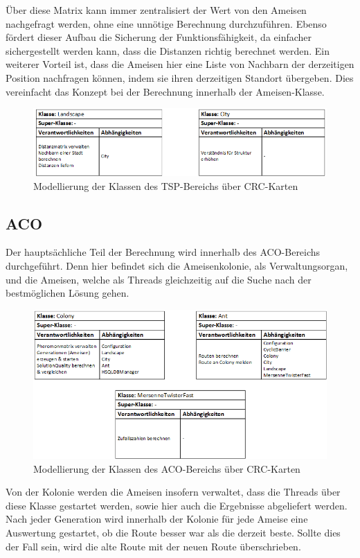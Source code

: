 Über diese Matrix kann immer zentralisiert der Wert von den Ameisen nachgefragt werden, ohne eine unnötige Berechnung durchzuführen. Ebenso fördert dieser Aufbau die Sicherung der Funktionsfähigkeit, da einfacher sichergestellt werden kann, dass die Distanzen richtig berechnet werden. Ein weiterer Vorteil ist, dass die Ameisen hier eine Liste von Nachbarn der derzeitigen Position nachfragen können, indem sie ihren derzeitigen Standort übergeben. Dies vereinfacht das Konzept bei der Berechnung innerhalb der Ameisen-Klasse.

\begin{figure}[h]
	\centering
	\includegraphics[width=0.7\linewidth]{images/CRC_tsp.png}
	\caption{Modellierung der Klassen des \acs{TSP}-Bereichs über CRC-Karten}
	\label{crcTsp}
\end{figure}

\newpage
\subsection{ACO}
Der hauptsächliche Teil der Berechnung wird innerhalb des \ac{ACO}-Bereichs durchgeführt. Denn hier befindet sich die Ameisenkolonie, als Verwaltungsorgan, und die Ameisen, welche als Threads gleichzeitig auf die Suche nach der bestmöglichen Lösung gehen.

\begin{figure}[h]
	\centering
	\includegraphics[width=0.8\linewidth]{images/CRC_aco.png}
	\caption{Modellierung der Klassen des \acs{ACO}-Bereichs über CRC-Karten}
	\label{crcAco}
\end{figure}

Von der Kolonie werden die Ameisen insofern verwaltet, dass die Threads über diese Klasse gestartet werden, sowie hier auch die Ergebnisse abgeliefert werden. Nach jeder Generation wird innerhalb der Kolonie für jede Ameise eine Auswertung gestartet, ob die Route besser war als die derzeit beste. Sollte dies der Fall sein, wird die alte Route mit der neuen Route überschrieben.

